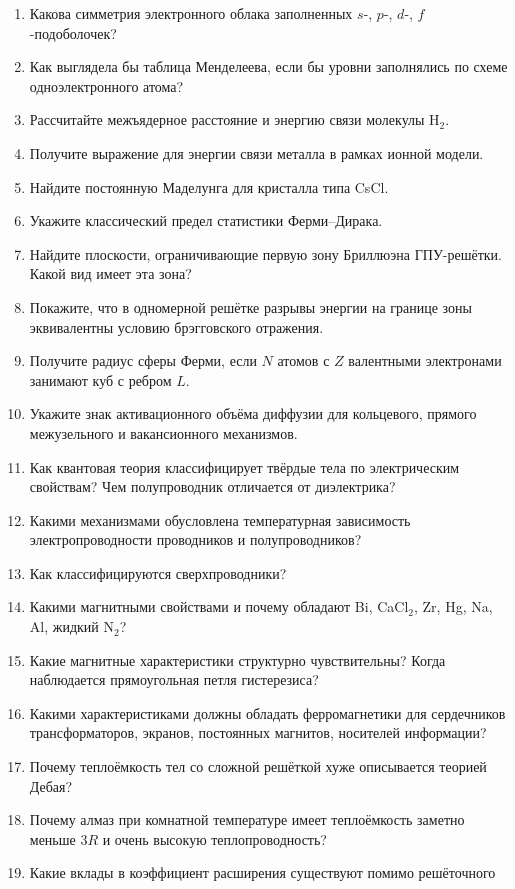 {\small
\begin{enumerate}[label=\arabic*.]
\item Какова симметрия электронного облака заполненных $s$-, $p$-, $d$-,
$f$-подоболочек?
\item Как выглядела бы таблица Менделеева, если бы уровни заполнялись по
схеме одноэлектронного атома?
\item Рассчитайте межъядерное расстояние и энергию связи молекулы H$_2$.
\item Получите выражение для энергии связи металла в рамках ионной
модели.
\item Найдите постоянную Маделунга для кристалла типа CsCl.
\item Укажите классический предел статистики Ферми--Дирака.
\item Найдите плоскости, ограничивающие первую зону Бриллюэна ГПУ-решётки.
Какой вид имеет эта зона?
\item Покажите, что в одномерной решётке разрывы энергии на границе зоны
эквивалентны условию брэгговского отражения.
\item Получите радиус сферы Ферми, если $N$ атомов с $Z$ валентными
электронами занимают куб с ребром $L$.
\item Укажите знак активационного объёма диффузии для кольцевого,
прямого межузельного и вакансионного механизмов.
\item Как квантовая теория классифицирует твёрдые тела по электрическим
свойствам? Чем полупроводник отличается от диэлектрика?
\item Какими механизмами обусловлена температурная зависимость
электропроводности проводников и полупроводников?
\item Как классифицируются сверхпроводники?
\item Какими магнитными свойствами и почему обладают Bi, CaCl$_2$, Zr, Hg,
Na, Al, жидкий N$_2$?
\item Какие магнитные характеристики структурно чувствительны? Когда
наблюдается прямоугольная петля гистерезиса?
\item Какими характеристиками должны обладать ферромагнетики для
сердечников трансформаторов, экранов, постоянных магнитов, носителей
информации?
\item Почему теплоёмкость тел со сложной решёткой хуже описывается теорией
Дебая?
\item Почему алмаз при комнатной температуре имеет теплоёмкость заметно
меньше $3R$ и очень высокую теплопроводность?
\item Какие вклады в коэффициент расширения существуют помимо решёточного

\end{enumerate}}
